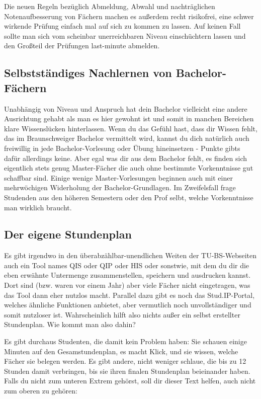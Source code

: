 \begin{multicols}{2}
Die neuen Regeln bezüglich Abmeldung, Abwahl und nachträglichen Notenaufbesserung von Fächern machen es außerdem recht risikofrei, eine schwer wirkende Prüfung einfach mal auf sich zu kommen zu lassen. Auf keinen Fall sollte man sich vom scheinbar unerreichbaren Niveau einschüchtern lassen und den Großteil der Prüfungen last-minute abmelden.

\subsection{Selbstständiges Nachlernen von Bachelor-Fächern}
Unabhängig von Niveau und Anspruch hat dein Bachelor vielleicht eine andere Ausrichtung gehabt als man es hier gewohnt ist und somit in manchen Bereichen klare Wissenslücken hinterlassen. Wenn du das Gefühl hast, dass dir Wissen fehlt, das im Braunschweiger Bachelor vermittelt wird, kannst du dich natürlich auch freiwillig in jede Bachelor-Vorlesung oder Übung hineinsetzen - Punkte gibts dafür allerdings keine. Aber egal was dir aus dem Bachelor fehlt, es finden sich eigentlich stets genug Master-Fächer die auch ohne bestimmte Vorkenntnisse gut schaffbar sind. Einige wenige Master-Vorlesungen beginnen auch mit einer mehrwöchigen Widerholung der Bachelor-Grundlagen. Im Zweifelsfall frage Studenden aus den höheren Semestern oder den Prof selbt, welche Vorkenntnisse man wirklich braucht.

\label{masterstundenplan}
\subsection{Der eigene Stundenplan}
Es gibt irgendwo in den überabzählbar-unendlichen Weiten der TU-BS-Webseiten auch ein Tool names QIS oder QIP oder HIS oder sonstwie, mit dem du dir die eben erwähnte Untermenge zusammenstellen, speichern und ausdrucken kannst. Dort sind (bzw. waren vor einem Jahr) aber viele Fächer nicht eingetragen, was das Tool dann eher nutzlos macht. Parallel dazu gibt es noch das Stud.IP-Portal, welches ähnliche Funktionen anbietet, aber vermutlich noch unvollständiger und somit nutzloser ist. Wahrscheinlich hilft also nichts außer ein selbst erstellter Stundenplan. Wie kommt man also dahin?

Es gibt durchaus Studenten, die damit kein Problem haben: Sie schauen einige Minuten auf den Gesamstundenplan, es macht Klick, und sie wissen, welche Fächer sie belegen werden. Es gibt andere, nicht weniger schlaue, die bis zu 12 Stunden damit verbringen, bis sie ihren finalen Stundenplan beieinander haben. Falls du nicht zum unteren Extrem gehörst, soll dir dieser Text helfen, auch nicht zum oberen zu gehören:


\end{multicols}
